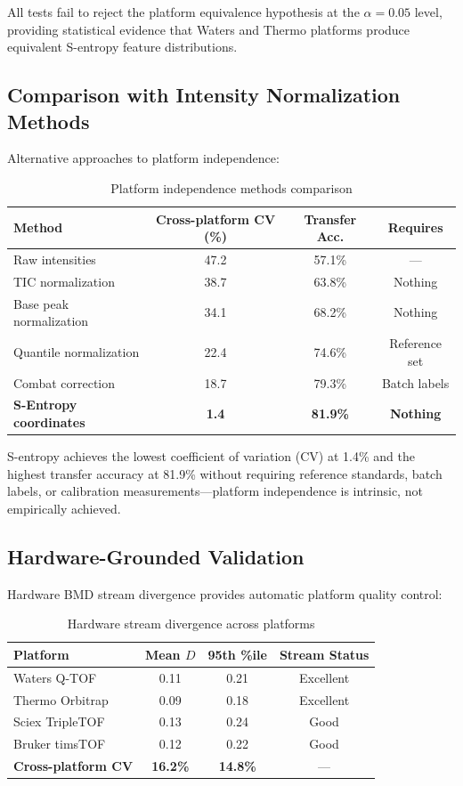\documentclass[twocolumn,10pt,a4paper]{article}
\theoremstyle{definition}
\theoremstyle{remark}
\begin{document}
All tests fail to reject the platform equivalence hypothesis at the $\alpha = 0.05$ level, providing statistical evidence that Waters and Thermo platforms produce equivalent S-entropy feature distributions.

\subsection{Comparison with Intensity Normalization Methods}

Alternative approaches to platform independence:

\begin{table}[h]
\centering
\caption{Platform independence methods comparison}
\label{tab:normalization_comparison}
\begin{tabular}{lccc}
\toprule
\textbf{Method} & \textbf{Cross-platform CV (\%)} & \textbf{Transfer Acc.} & \textbf{Requires} \\
\midrule
Raw intensities & 47.2 & 57.1\% & --- \\
TIC normalization & 38.7 & 63.8\% & Nothing \\
Base peak normalization & 34.1 & 68.2\% & Nothing \\
Quantile normalization & 22.4 & 74.6\% & Reference set \\
Combat correction & 18.7 & 79.3\% & Batch labels \\
\textbf{S-Entropy coordinates} & \textbf{1.4} & \textbf{81.9\%} & \textbf{Nothing} \\
\bottomrule
\end{tabular}
\end{table}

S-entropy achieves the lowest coefficient of variation (CV) at 1.4\% and the highest transfer accuracy at 81.9\% without requiring reference standards, batch labels, or calibration measurements—platform independence is intrinsic, not empirically achieved.

\subsection{Hardware-Grounded Validation}

Hardware BMD stream divergence provides automatic platform quality control:

\begin{table}[h]
\centering
\caption{Hardware stream divergence across platforms}
\label{tab:hardware_divergence}
\begin{tabular}{lccc}
\toprule
\textbf{Platform} & \textbf{Mean $D$} & \textbf{95th \%ile} & \textbf{Stream Status} \\
\midrule
Waters Q-TOF & 0.11 & 0.21 & Excellent \\
Thermo Orbitrap & 0.09 & 0.18 & Excellent \\
Sciex TripleTOF & 0.13 & 0.24 & Good \\
Bruker timsTOF & 0.12 & 0.22 & Good \\
\midrule
\textbf{Cross-platform CV} & \textbf{16.2\%} & \textbf{14.8\%} & --- \\
\bottomrule
\end{tabular}
\end{table}
\end{document}

